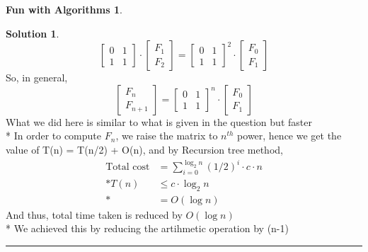 \documentclass{article}
\theoremstyle{definition}
\newtheorem*{fun}{Fun with Algorithms}
\def\fline{\rule{0.75\linewidth}{0.5pt}}
\newcommand{\finishline}{\vspace{-15pt}\begin{center}\fline\end{center}}
\newtheorem*{solution*}{Solution}
\newenvironment{solution}{\begin{solution*}}{{\finishline} \end{solution*}}
\begin{document}
\begin{fun}
\begin{enumerate}[label=(\alph*)]
\begin{solution}
\[\begin{bmatrix}
			0 & 1 \\
			1 & 1
		\end{bmatrix}
		\cdot
	 	\begin{bmatrix}
			F_{1} \\
			F_{2}
		\end{bmatrix}
		= 
		\begin{bmatrix}
			0 & 1 \\
			1 & 1
		\end{bmatrix}^2
		\cdot
		\begin{bmatrix}
			F_{0} \\
			F_{1}
		\end{bmatrix}
		\]
		So, in general,
		\[
		\begin{bmatrix}
			F_{n} \\
			F_{n+1}
		\end{bmatrix}
		=
		\begin{bmatrix}
			0 & 1 \\
			1 & 1
		\end{bmatrix}^n
		\cdot
		\begin{bmatrix}
			F_{0} \\
			F_{1}
		\end{bmatrix}
		\]
		What we did here is similar to what is given in the question but faster \\*
		In order to compute $F_n$, we raise the matrix to $n^{th}$ power, hence we get the value of T(n) = T(n/2) + O(n), and by Recursion tree method, 
		\begin{align*}
			{\text{Total cost}} &=  \sum_{i=0}^{\log_2 n} (1/2)^{i}\cdot c\cdot n \\*
			T(n) &\leq c\cdot \log_2 n \\*
			&= O(\log n) 
		 \end{align*}
		And thus, total time taken is reduced by $O(\log n)$ \\*
		We achieved this by reducing the artihmetic operation by (n-1)
		\end{solution}	
	\end{enumerate}	
\end{fun}
\end{document}
